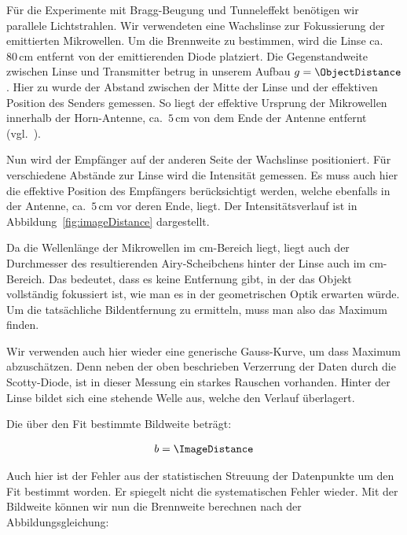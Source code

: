 \documentclass[a4paper,10pt,twocolumn]{article}
\begin{document}
    Für die Experimente mit Bragg-Beugung und Tunneleffekt benötigen wir parallele Lichtstrahlen. 
    Wir verwendeten eine Wachslinse zur Fokussierung der emittierten Mikrowellen. 
    Um die Brennweite zu bestimmen, wird die Linse ca.\ $80\, \mathrm{cm}$ entfernt von der emittierenden Diode platziert. 
    Die Gegenstandweite zwischen Linse und Transmitter betrug in unserem Aufbau $g = \ObjectDistance$.
    Hier zu wurde der Abstand zwischen der Mitte der Linse und der effektiven Position des Senders gemessen.
    So liegt der effektive Ursprung der Mikrowellen innerhalb der Horn-Antenne, ca.\ $5\,\mathrm{cm}$ von dem
    Ende der Antenne entfernt (vgl.\ \cite{pasco}).
    
    Nun wird der Empfänger auf der anderen Seite der Wachslinse positioniert.
    Für verschiedene Abstände zur Linse wird die Intensität gemessen.
    Es muss auch hier die effektive Position des Empfängers berücksichtigt werden, welche ebenfalls in der
    Antenne, ca.\ $5\,\mathrm{cm}$ vor deren Ende, liegt.
    Der Intensitätsverlauf ist in Abbildung~\ref{fig:imageDistance} dargestellt.
    
    Da die Wellenlänge der Mikrowellen im cm-Bereich liegt, liegt auch der Durchmesser 
    des resultierenden Airy-Scheibchens hinter der Linse auch im cm-Bereich.
    Das bedeutet, dass es keine Entfernung gibt, in der das Objekt vollständig fokussiert ist, wie man es in der
    geometrischen Optik erwarten würde. 
    Um die tatsächliche Bildentfernung zu ermitteln, muss man also das Maximum finden.
    
    Wir verwenden auch hier wieder eine generische Gauss-Kurve, um dass Maximum abzuschätzen.
    Denn neben der oben beschrieben Verzerrung der Daten durch die Scotty-Diode, ist in dieser Messung ein
    starkes Rauschen vorhanden.
    Hinter der Linse bildet sich eine stehende Welle aus, welche den Verlauf überlagert.
    
    
    Die über den Fit bestimmte Bildweite beträgt:
    
    \begin{align*}
        b = \ImageDistance
    \end{align*}

    Auch hier ist der Fehler aus der statistischen Streuung der Datenpunkte um den Fit bestimmt worden.
    Er spiegelt nicht die systematischen Fehler wieder.
    Mit der Bildweite können wir nun die Brennweite berechnen nach der Abbildungsgleichung:
    
\end{document}
